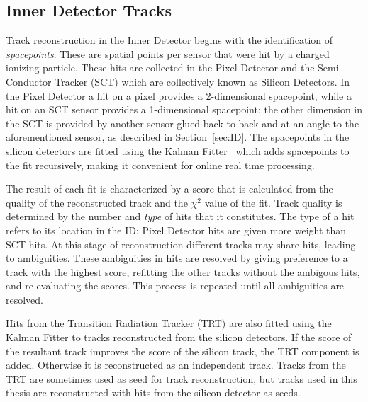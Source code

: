\subsection{Inner Detector Tracks}
\label{sec:idtracks}
\par Track reconstruction in the Inner Detector begins with the identification 
of {\it spacepoints}. These are spatial points per sensor that were hit by a charged  
ionizing particle. These hits are collected in the Pixel Detector and the Semi-Conductor 
Tracker (SCT) which are collectively known as Silicon Detectors. In the Pixel Detector a hit on a 
pixel provides a 2-dimensional spacepoint, while a hit on an SCT sensor provides a 1-dimensional 
spacepoint; the other dimension in the SCT is provided by another sensor glued back-to-back and 
at an angle to the aforementioned sensor, as described in Section~\ref{sec:ID}.
The spacepoints in the silicon detectors are fitted using the Kalman Fitter~\cite{citeulike:347166} 
which adds spacepoints to the fit recursively, making it convenient for online real 
time processing.   

\par The result of each fit is characterized by a score that is calculated from the 
quality of the reconstructed track and the $\chi^2$ value of the fit. Track quality 
is determined by the number and {\it type} of hits that it constitutes. The type of a hit 
refers to its location in the ID: Pixel Detector hits are given more weight than
 SCT hits. At this stage of reconstruction different tracks may 
share hits, leading to ambiguities. These ambiguities in hits are resolved by giving 
preference to a track with the highest score, refitting the other tracks without the ambigous 
hits, and re-evaluating the scores. This process is repeated until all ambiguities are resolved. 

\par Hits from the Transition Radiation Tracker (TRT) are also fitted using the Kalman Fitter 
to tracks reconstructed from the silicon detectors. If the score of the resultant track 
improves the score of the silicon track, the TRT component is added. Otherwise it is 
reconstructed as an independent track. Tracks from the TRT are sometimes used as seed for 
track reconstruction, but tracks used in this thesis are reconstructed with hits from the 
silicon detector as seeds.  

